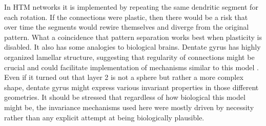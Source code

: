 \documentclass[12pt]{article}
\begin{document}
In HTM networks it is implemented by repeating the same dendritic segment for each rotation. If the connections were plastic, then there would be a risk that over time the segments would rewire themselves and diverge from the original pattern. What a coincidence that pattern separation works best when plasticity is disabled. It also has some 
analogies to biological brains. Dentate gyrus has highly organized lamellar structure, suggesting that regularity of connections might be crucial and could facilitate implementation of mechanisms similar to this model \cite{Spatial_Representations_of_Granule_Cells,Pattern_separation_of_spiketrains}. Even if it turned out that layer 2 is not a sphere but rather a more complex shape, dentate gyrus might express various invariant properties in those different geometries. It should be stressed that regardless of how biological this model might be, the invariance mechanisms used here were mostly driven by necessity rather than any explicit attempt at being biologically plausible. 
\end{document}

